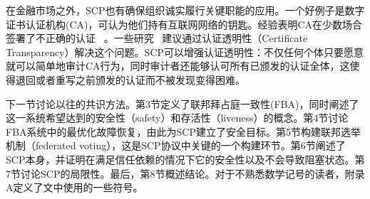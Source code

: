 在金融市场之外，SCP也有确保组织诚实履行关键职能的应用。一个好例子是数字证书认证机构(CA)，可认为他们持有互联网网络的钥匙。经验表明CA在少数场合签署了不正确的认证~\cite{ac_ms2013,dc_google2015} 。一些研究~\cite{Kim:2013up,ct_google2013,Basin:2014bn,cryptoeprint:2014:1004} 建议通过认证透明性（Certificate Transparency）解决这个问题。SCP可以增强认证透明性：不仅任何个体只要愿意就可以简单地审计CA行为，同时审计者还能够认可所有已颁发的认证全体，这使得退回或者重写之前颁发的认证而不被发现变得困难。

下一节讨论以往的共识方法。第3节定义了联邦拜占庭一致性(FBA)，同时阐述了这一系统希望达到的安全性（safety）和存活性（liveness）的概念。第4节讨论FBA系统中的最优化故障恢复，由此为SCP建立了安全目标。第5节构建联邦选举机制（federated voting），这是SCP协议中关键的一个构建环节。第6节阐述了SCP本身，并证明在满足信任依赖的情况下它的安全性以及不会导致阻塞状态。第7节讨论SCP的局限性。最后，第8节概述结论。对于不熟悉数学记号的读者，附录A定义了文中使用的一些符号。